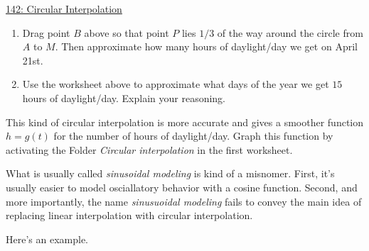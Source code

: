\documentclass{ximera}
\begin{document}
 
\begin{onlineOnly}
    \begin{center}
\end{center}
\end{onlineOnly}

\href{https://www.desmos.com/calculator/nfsifbppzz}{142: Circular Interpolation}

\begin{enumerate}
\item Drag point $B$ above so that point $P$ lies $1/3$ of the way around the circle from $A$ to $M$. Then approximate how many hours of daylight/day we get on April 21st.
\begin{freeResponse} 
\end{freeResponse}

\item Use the worksheet above to approximate what days of the year we get $15$ hours of daylight/day. Explain your reasoning.
\begin{freeResponse}
\end{freeResponse}
\end{enumerate}

This kind of circular interpolation is more accurate and gives a smoother function $h=g(t)$ for the number of hours of daylight/day. Graph this function by activating the Folder \emph{Circular interpolation} in the first worksheet.



What is usually called \emph{sinusoidal modeling} is kind of a misnomer. First, it's usually easier to model osciallatory behavior with a cosine function. Second, and more importantly, the name \emph{sinusuoidal modeling} fails to convey the main idea of replacing linear interpolation with circular interpolation.

Here's an example.
\end{document}
